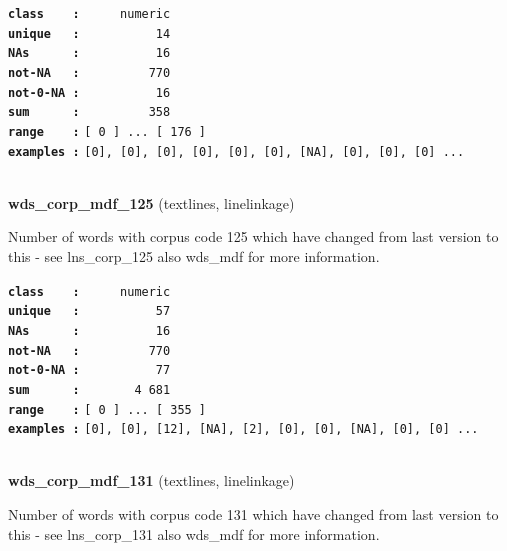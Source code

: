 \documentclass[]{article}
\begin{document}
\textbf{\texttt{class\ \ \ \ :}} \texttt{~~~~~numeric}\\
\textbf{\texttt{unique\ \ \ :}} \texttt{~~~~~~~~~~14}\\
\textbf{\texttt{NAs\ \ \ \ \ \ :}} \texttt{~~~~~~~~~~16}\\
\textbf{\texttt{not-NA\ \ \ :}} \texttt{~~~~~~~~~770}\\
\textbf{\texttt{not-0-NA\ :}} \texttt{~~~~~~~~~~16}\\
\textbf{\texttt{sum\ \ \ \ \ \ :}} \texttt{~~~~~~~~~358}\\
\textbf{\texttt{range\ \ \ \ :}}
\texttt{{[}\ 0\ {]}\ ...\ {[}\ 176\ {]}}\\
\textbf{\texttt{examples\ :}}
\texttt{{[}0{]},\ {[}0{]},\ {[}0{]},\ {[}0{]},\ {[}0{]},\ {[}0{]},\ {[}NA{]},\ {[}0{]},\ {[}0{]},\ {[}0{]}\ ...}\\

~

\textbf{wds\_corp\_mdf\_125} (textlines, linelinkage)

Number of words with corpus code 125 which have changed from last
version to this - see lns\_corp\_125 also wds\_mdf for more information.

\textbf{\texttt{class\ \ \ \ :}} \texttt{~~~~~numeric}\\
\textbf{\texttt{unique\ \ \ :}} \texttt{~~~~~~~~~~57}\\
\textbf{\texttt{NAs\ \ \ \ \ \ :}} \texttt{~~~~~~~~~~16}\\
\textbf{\texttt{not-NA\ \ \ :}} \texttt{~~~~~~~~~770}\\
\textbf{\texttt{not-0-NA\ :}} \texttt{~~~~~~~~~~77}\\
\textbf{\texttt{sum\ \ \ \ \ \ :}} \texttt{~~~~~~~4~681}\\
\textbf{\texttt{range\ \ \ \ :}}
\texttt{{[}\ 0\ {]}\ ...\ {[}\ 355\ {]}}\\
\textbf{\texttt{examples\ :}}
\texttt{{[}0{]},\ {[}0{]},\ {[}12{]},\ {[}NA{]},\ {[}2{]},\ {[}0{]},\ {[}0{]},\ {[}NA{]},\ {[}0{]},\ {[}0{]}\ ...}\\

~

\textbf{wds\_corp\_mdf\_131} (textlines, linelinkage)

Number of words with corpus code 131 which have changed from last
version to this - see lns\_corp\_131 also wds\_mdf for more information.
\end{document}
